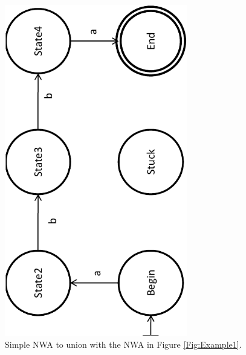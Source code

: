 \begin{figure}[htbp]
  \centering
    \includegraphics[width=8cm]{Figures/Figure3}
  \caption{Simple NWA to union with the NWA in Figure \ref{Fig:Example1}.}
  \label{Fig:Union1}
\end{figure}

